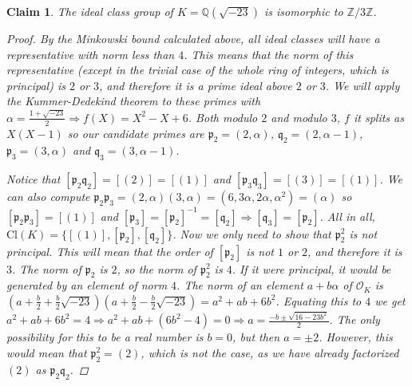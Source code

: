 \documentclass[11pt]{article}
\newtheorem{claim}[theorem]{Claim}
\theoremstyle{definition}
\begin{document}
    \begin{claim} \label{claim:sqrt-23}
        The ideal class group of $K = \mathbb{Q}\left(\sqrt {-23}\right)$ is isomorphic to $\mathbb{Z}/3\mathbb{Z}$.

        \begin{proof}
            By the Minkowski bound calculated above, all ideal classes will have a representative with norm less than $4$.
            This means that the norm of this representative (except in the trivial case of the whole ring of integers, which is principal) is
            $2$ or $3$, and therefore it is a prime ideal above $2$ or $3$.
            We will apply the Kummer-Dedekind theorem to these primes with $\alpha = \frac{1+\sqrt {-23}}{2} \Rightarrow f(X) = X^2 - X + 6$.
            Both modulo $2$ and modulo $3$, $f$ it splits as $X(X-1)$ so our candidate primes are $\mathfrak{p}_2 = (2, \alpha)$, $\mathfrak{q}_2 = (2, \alpha - 1)$,
            $\mathfrak{p}_3 = (3, \alpha)$ and $\mathfrak{q}_3 = (3, \alpha - 1)$.\linebreak

            \noindent Notice that $[\mathfrak{p}_2 \mathfrak{q}_2] = [(2)] = [(1)]$ and $[\mathfrak{p}_3 \mathfrak{q}_3] = [(3)] = [(1)]$.
            We can also compute $\mathfrak{p}_2\mathfrak{p}_3 = (2, \alpha)(3, \alpha) = (6, 3\alpha, 2\alpha, \alpha^2) = (\alpha)$
            so $[\mathfrak{p}_2\mathfrak{p}_3] = [(1)]$ and
            $[\mathfrak{p}_3] = [\mathfrak{p}_2]^{-1} = [\mathfrak{q}_2] \Rightarrow [\mathfrak{q}_3] = [\mathfrak{p_2}]$.
            All in all, $\text{Cl}(K) = \{[(1)], [\mathfrak{p}_2], [\mathfrak{q}_2]\}$.
            Now we only need to show that $\mathfrak{p}_2^2$ is not principal.
            This will mean that the order of $[\mathfrak{p}_2]$ is not $1$ or $2$, and therefore it is $3$.
            The norm of $\mathfrak{p}_2$ is $2$, so the norm of $\mathfrak{p}_2^2$ is $4$.
            If it were principal, it would be generated by an element of norm $4$.
            The norm of an element $a + b \alpha$ of $\mathcal{O}_K$ is
            $\left(a + \frac{b}{2} + \frac{b}{2}\sqrt{-23}\right)\left(a + \frac{b}{2} - \frac{b}{2}\sqrt{-23}\right) = a^2 + ab + 6b^2$.
            Equating this to $4$ we get $a^2 + ab + 6b^2 = 4 \Rightarrow a^2 + ab + (6b^2 - 4) = 0 \Rightarrow a = \frac{-b \pm \sqrt{16 - 23b^2}}{2}$.
            The only possibility for this to be a real number is $b = 0$, but then $a = \pm 2$.
            However, this would mean that $\mathfrak{p}_2^2 = (2)$, which is not the case, as we have already factorized $(2)$ as $\mathfrak{p}_2\mathfrak{q}_2$.

        \end{proof}

    \end{claim}
\end{document}
